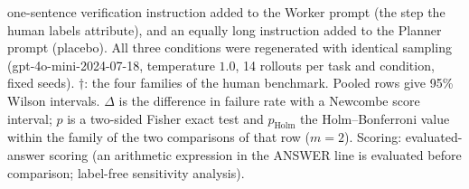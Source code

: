 \begin{table}[t]
{one-sentence verification instruction added to the Worker prompt (the step the human labels
attribute), and an equally long instruction added to the Planner prompt (placebo). All three
conditions were regenerated with identical sampling (gpt-4o-mini-2024-07-18, temperature $1.0$,
14 rollouts per task and condition, fixed seeds).
$\dagger$: the four families of the human benchmark. Pooled rows give 95\% Wilson intervals.
$\Delta$ is the difference in failure rate with a Newcombe score interval; $p$ is a two-sided
Fisher exact test and $p_{\mathrm{Holm}}$ the Holm--Bonferroni value within the family of the two
comparisons of that row ($m{=}2$). Scoring: evaluated-answer scoring (an arithmetic expression in the ANSWER line is evaluated before comparison; label-free sensitivity analysis).}
\label{tab:intervention-evaluated}
\end{table}
